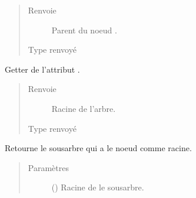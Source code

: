 \documentclass[letterpaper,10pt,french]{sphinxmanual}
\begin{document}
\begin{fulllineitems}
\begin{fulllineitems}
\begin{quote}
\begin{description}
\item[{Renvoie}] \leavevmode
{} \textendash{} Parent du noeud .

\item[{Type renvoyé}] \leavevmode
{\hyperref[\detokenize{index:StrategyTree.NodeST}]{}}

\end{description}\end{quote}

\end{fulllineitems}


\begin{fulllineitems}
\label{\detokenize{index:StrategyTree.StrategyTree.get_root}}
Getter de l’attribut .
\begin{quote}\begin{description}
\item[{Renvoie}] \leavevmode
{} \textendash{} Racine de l’arbre.

\item[{Type renvoyé}] \leavevmode
{\hyperref[\detokenize{index:StrategyTree.NodeST}]{}}

\end{description}\end{quote}

\end{fulllineitems}


\begin{fulllineitems}
\label{\detokenize{index:StrategyTree.StrategyTree.get_sub_tree}}
Retourne le sous\sphinxhyphen{}arbre qui a le noeud  comme racine.
\begin{quote}\begin{description}
\item[{Paramètres}] \leavevmode
{} ({\hyperref[\detokenize{index:StrategyTree.NodeST}]{}}) \textendash{} Racine de le sous\sphinxhyphen{}arbre.


\end{description}
\end{quote}
\end{fulllineitems}
\end{fulllineitems}
\end{document}
